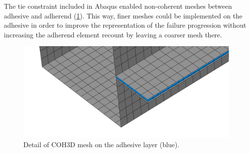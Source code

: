 \documentclass[cmfonts]{witpress}
\begin{document}
The tie constraint included in Abaqus enabled non-coherent meshes between adhesive and adherend (\cref{fig:mesh_detail_coh3d_comparison}). This way, finer meshes could be implemented on the adhesive in order to improve the representation of the failure progression without increasing the adherend element recount by leaving a coarser mesh there.

\begin{figure}[htpb]
	\centering
	\includegraphics[width=0.7\linewidth]{figures/IMG_CUTRES/mesh_detail_coh3d_comparison}
	\caption[Detail of COH3D mesh on the adhesive layer.]{Detail of COH3D mesh on the adhesive layer (blue).}
	\label{fig:mesh_detail_coh3d_comparison}
\end{figure}
\end{document}
